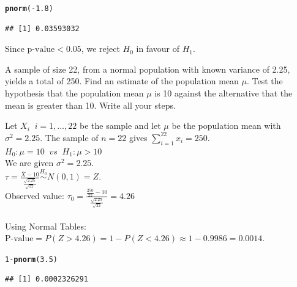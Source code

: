 \documentclass[bigtut]{tutorial}\usepackage[]{graphicx}\usepackage[]{color}
\makeatletter
\newcommand{\hlnum}[1]{\textcolor[rgb]{0.686,0.059,0.569}{#1}}%
\newcommand{\hlopt}[1]{\textcolor[rgb]{0,0,0}{#1}}%
\newcommand{\hlstd}[1]{\textcolor[rgb]{0.345,0.345,0.345}{#1}}%
\newcommand{\hlkwd}[1]{\textcolor[rgb]{0.737,0.353,0.396}{\textbf{#1}}}%
\newenvironment{kframe}{%
 \def\at@end@of@kframe{}%
 \ifinner\ifhmode%
  \def\at@end@of@kframe{\end{minipage}}%
  \begin{minipage}{\columnwidth}%
 \fi\fi%
 \def\FrameCommand##1{\hskip\@totalleftmargin \hskip-\fboxsep
 \colorbox{shadecolor}{##1}\hskip-\fboxsep
     \hskip-\linewidth \hskip-\@totalleftmargin \hskip\columnwidth}%
 \MakeFramed {\advance\hsize-\width
   \@totalleftmargin\z@ \linewidth\hsize
   \@setminipage}}%
 {\par\unskip\endMakeFramed%
 \at@end@of@kframe}
\newenvironment{knitrout}{}{} %
\makeatother
\begin{document}
\begin{tutorial}
\begin{questions}
\begin{solution}
\begin{knitrout}
\color{fgcolor}\begin{kframe}
\begin{alltt}
\hlkwd{pnorm}\hlstd{(}\hlopt{-}\hlnum{1.8}\hlstd{)}
\end{alltt}
\begin{verbatim}
## [1] 0.03593032
\end{verbatim}
\end{kframe}
\end{knitrout}

\vspace{.5cm}
Since $\text{p-value} < 0.05$, we reject $H_{0}$ in favour of $H_{1}$. \\
\end{solution}





\question 

A sample of size 22, from a normal population with known
variance of 2.25,  yields a total of 250.  Find an estimate of
 the population mean $\mu$.
Test the hypothesis that the
population mean $\mu$ is 10 against the alternative that the mean
is greater than 10. Write all your steps.

\begin{solution}
Let $X_{i} \;\; i=1,\ldots,22$ be the sample and let $\mu$ be the population mean with $\sigma^2=2.25$. The sample of $n=22$ gives $\sum_{i=1}^{22} x_{i}=250$.\\

$H_0: \mu=10  \;\; vs \;\; H_1: \mu > 10$ \\

We are given $\sigma^2 = 2.25$. \\

$\tau = \frac{ \bar{X} - 10}{\frac{\sqrt{2.25}}{\sqrt{22}}} \overset{H_0}{\sim} N(0,1) = Z$. \\
Observed value: $\tau_{0} = \frac{\frac{250}{22}-10}{\frac{\sqrt{2.25}}{\sqrt{22}}} = 4.26$ \\

 \\

Using Normal Tables: \\
$\text{P-value} = P( Z >4.26) = 1-P(Z < 4.26) \approx  1-0.9986  = 0.0014$. \\

\begin{knitrout}
\color{fgcolor}\begin{kframe}
\begin{alltt}
\hlnum{1}\hlopt{-}\hlkwd{pnorm}\hlstd{(}\hlnum{3.5}\hlstd{)}
\end{alltt}
\begin{verbatim}
## [1] 0.0002326291
\end{verbatim}
\end{kframe}
\end{knitrout}


\end{solution}
\end{questions}
\end{tutorial}
\end{document}
